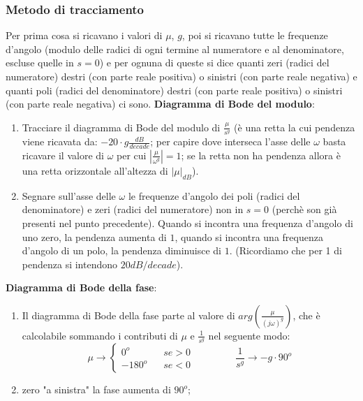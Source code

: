 \begin{landscape}
    \subsubsection*{Metodo di tracciamento}
    Per prima cosa si ricavano i valori di $\mu$, $g$, poi si ricavano tutte le frequenze d'angolo (modulo delle radici di ogni termine al numeratore e al denominatore, escluse quelle in $s=0$) e per ognuna di queste si dice quanti zeri (radici del numeratore) destri (con parte reale positiva) o sinistri (con parte reale negativa) e quanti poli (radici del denominatore) destri (con parte reale positiva) o sinistri (con parte reale negativa) ci sono.\newline
    \newline
    \textbf{Diagramma di Bode del modulo}: 
    \begin{enumerate}
        \item Tracciare il diagramma di Bode del modulo di $\frac{\mu}{s^g}$ (è una retta la cui pendenza viene ricavata da: $-20 \cdot g \frac{dB}{decade}$; per capire dove interseca l'asse delle $\omega$ basta ricavare il valore di $\omega$ per cui $\left| \frac{\mu}{\omega^g} \right| = 1$; se la retta non ha pendenza allora è una retta orizzontale all'altezza di $|\mu|_{dB}$).
        \item Segnare sull'asse delle $\omega$ le frequenze d'angolo dei poli (radici del denominatore) e zeri (radici del numeratore) non in $s=0$ (perchè son già presenti nel punto precedente).\newline
        Quando si incontra una frequenza d'angolo di uno zero, la pendenza aumenta di $1$, quando si incontra una frequenza d'angolo di un polo, la pendenza diminuisce di $1$. (Ricordiamo che per 1 di pendenza si intendono $20 dB/decade$).
    \end{enumerate}
    \textbf{Diagramma di Bode della fase}:
    \begin{enumerate}
        \item Il diagramma di Bode della fase parte al valore di $arg(\frac{\mu}{(j \omega)^g})$, che è calcolabile sommando i contributi di $\mu$ e $\frac{1}{s^g}$ nel seguente modo:
        \[
            \mu \rightarrow \begin{cases}
                0^o \;\;\;& se > 0\\
                -180^o \;\;\; & se <0
            \end{cases} \;\;\;\;\;\;\;\;\;\;\;\;\;\;\; \frac{1}{s^g}\rightarrow -g \cdot 90^o
        \]
        \item zero "a sinistra" la fase aumenta di $90^o$;\newline

\end{enumerate}
\end{landscape}
